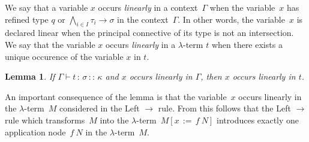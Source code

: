 \documentclass{eptcs}
\newtheorem{lemma}{Lemma}
\begin{document}
We say that a variable $x$ occurs \emph{linearly} in a context~$\Gamma$
when the variable~$x$ has refined type $q$ or $\bigwedge_{i \in I} \tau_i \rightarrow \sigma$ in the context~$\Gamma$.
In other words, the variable~$x$ is declared linear when the principal connective of its type is not an intersection.
We say that the variable $x$ occurs \emph{linearly} in a $\lambda$-term $t$ when there exists a unique occurence of the variable $x$ in $t$.

\begin{lemma}
If $\Gamma \vdash t\,:\,\sigma\,::\,\kappa$ and $x$ occurs linearly in $\Gamma$, then $x$ occurs linearly in $t$.
\end{lemma}

An important consequence of the lemma is that the variable~$x$ occurs linearly 
in the $\lambda$-term~$M$ considered in the Left $\rightarrow$ rule.
From this follows that the Left $\rightarrow$ rule which transforms~$M$ 
into the $\lambda$-term~$M[x\,:=\,f\ N]$ introduces exactly one application node~$f\ N$
in the $\lambda$-term~$M$.
\end{document}
